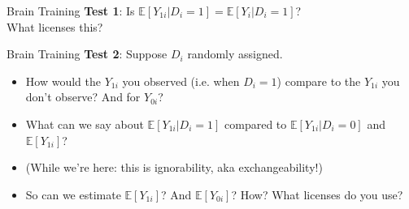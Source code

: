 \documentclass[xcolor=dvipsnames]{beamer}
\newcommand\E{\mathbb{E}}
\newcommand\indep{\protect\mathpalette{\protect\independenT}{\perp}}
\def\independenT#1#2{\mathrel{\rlap{$#1#2$}\mkern2mu{#1#2}}}
\begin{document}


\begin{frame}{Brain Training}
\textbf{Test 1}: Is $\E[Y_{1i}|D_i=1]=\E[Y_i|D_i=1]$?\\

\bigskip
{} What licenses this?

\end{frame}

\begin{frame}{Brain Training}
 \textbf{Test 2}: Suppose $D_i$ randomly assigned. 
\small
\begin{itemize}
\item<2-> How would the $Y_{1i}$ you observed (i.e. when $D_i=1$) compare to the $Y_{1i}$ you don't observe? And for $Y_{0i}$?
\bigskip
\item<3-> What can we say about $\E[Y_{1i}|D_i=1]$ compared to $\E[Y_{1i}|D_i=0]$ and $\E[Y_{1i}]$?
\bigskip
\item<4->[] (While we're here: this is ignorability, aka exchangeability!)
\bigskip
\item<5-> So can we estimate $\E[Y_{1i}]$? And $\E[Y_{0i}]$?  How? What licenses do you use?
\end{itemize}
\end{frame}
\end{document}
